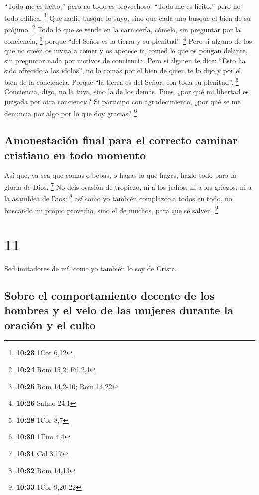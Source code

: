 ``Todo me es lícito,'' pero no todo es provechoso.
``Todo me es lícito,'' pero no todo edifica. \footnote{\textbf{10:23}
  1Cor 6,12}  Que nadie busque lo suyo, sino que cada uno
busque el bien de su prójimo. \footnote{\textbf{10:24} Rom 15,2; Fil 2,4}
 Todo lo que se vende en la carnicería, cómelo, sin
preguntar por la conciencia, \footnote{\textbf{10:25} Rom 14,2-10; Rom
  14,22}  porque ``del Señor es la tierra y su
plenitud''. \footnote{\textbf{10:26} Salmo 24:1}  Pero si
alguno de los que no creen os invita a comer y os apetece ir, comed lo
que os pongan delante, sin preguntar nada por motivos de conciencia.
 Pero si alguien te dice: ``Esto ha sido ofrecido a los
ídolos'', no lo comas por el bien de quien te lo dijo y por el bien de
la conciencia. Porque ``la tierra es del Señor, con toda su plenitud''.
\footnote{\textbf{10:28} 1Cor 8,7}  Conciencia, digo, no
la tuya, sino la de los demás. Pues, ¿por qué mi libertad es juzgada por
otra conciencia?  Si participo con agradecimiento, ¿por
qué se me denuncia por algo por lo que doy gracias? \footnote{\textbf{10:30}
  1Tim 4,4}

\hypertarget{amonestaciuxf3n-final-para-el-correcto-caminar-cristiano-en-todo-momento}{%
\subsection{Amonestación final para el correcto caminar cristiano en
todo
momento}\label{amonestaciuxf3n-final-para-el-correcto-caminar-cristiano-en-todo-momento}}

 Así que, ya sea que comas o bebas, o hagas lo que hagas,
hazlo todo para la gloria de Dios. \footnote{\textbf{10:31} Col 3,17}
 No deis ocasión de tropiezo, ni a los judíos, ni a los
griegos, ni a la asamblea de Dios; \footnote{\textbf{10:32} Rom 14,13}
 así como yo también complazco a todos en todo, no
buscando mi propio provecho, sino el de muchos, para que se salven.
\footnote{\textbf{10:33} 1Cor 9,20-22}

\hypertarget{section-10}{%
\section{11}\label{section-10}}

 Sed imitadores de mí, como yo también lo soy de Cristo.

\hypertarget{sobre-el-comportamiento-decente-de-los-hombres-y-el-velo-de-las-mujeres-durante-la-oraciuxf3n-y-el-culto}{%
\subsection{Sobre el comportamiento decente de los hombres y el velo de
las mujeres durante la oración y el
culto}\label{sobre-el-comportamiento-decente-de-los-hombres-y-el-velo-de-las-mujeres-durante-la-oraciuxf3n-y-el-culto}}

